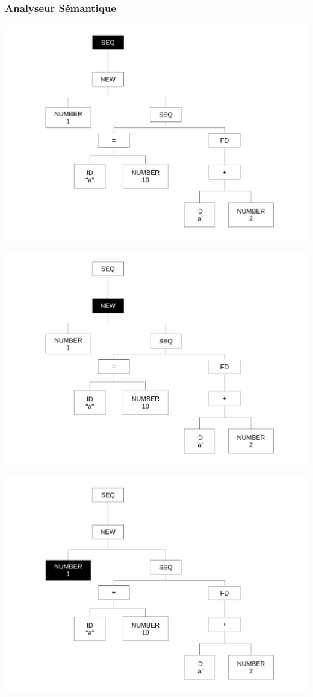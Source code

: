 \begin{frame}
	\frametitle{Analyseur Sémantique}
\includegraphics[scale=0.3]{doc/Presentation/img/arbre1.pdf}
\end{frame}

\begin{frame}
\includegraphics[scale=0.3]{doc/Presentation/img/arbre2.pdf}
\end{frame}

\begin{frame}
\includegraphics[scale=0.3]{doc/Presentation/img/arbre3.pdf}
\end{frame}

